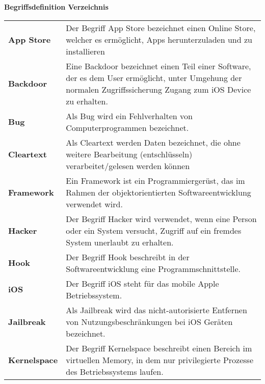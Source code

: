 %
%
% 
% 
% 

\begin{center}
{\Large\bfseries Begriffsdefinition Verzeichnis}
\end{center}

\begin{table*}[htbp]
    \begin{center}
      \begin{tabular}{p{3cm}p{12cm}} 
        
        \textbf{App Store} &  Der Begriff App Store bezeichnet einen Online Store, welcher es ermöglicht, Apps herunterzuladen und zu installieren\\ 
        
        \textbf{Backdoor} &  Eine Backdoor bezeichnet einen Teil einer Software, der es dem User ermöglicht, unter Umgehung der normalen Zugriffssicherung Zugang zum iOS Device zu erhalten.\\
        \textbf{Bug} &  Als Bug wird ein Fehlverhalten von Computerprogrammen bezeichnet.\\ 
		
		\textbf{Cleartext} &  Als Cleartext werden Daten bezeichnet, die ohne weitere Bearbeitung (entschlüsseln) verarbeitet/gelesen werden können\\     
		
		\textbf{Framework} & Ein Framework ist ein Programmiergerüst, das im Rahmen der objektorientierten Softwareentwicklung verwendet wird. \\
		
		\textbf{Hacker} &  Der Begriff Hacker wird verwendet, wenn eine Person oder ein System versucht, Zugriff auf ein fremdes System unerlaubt zu erhalten.\\
		\textbf{Hook} & Der Begriff Hook beschreibt in der Softwareentwicklung eine Programmschnittstelle.\\
		  
		\textbf{iOS} &  Der Begriff iOS steht für das mobile Apple Betriebssystem.\\
		  
		 \textbf{Jailbreak} &  Als Jailbreak wird das nicht-autorisierte Entfernen von Nutzungsbeschränkungen bei iOS Geräten bezeichnet.\\  
		 \textbf{Kernelspace} & Der Begriff Kernelspace beschreibt einen Bereich im virtuellen Memory, in dem nur privilegierte Prozesse des Betriebssystems laufen.\\ 
		      

\end{tabular}
\end{center}
\end{table*}
